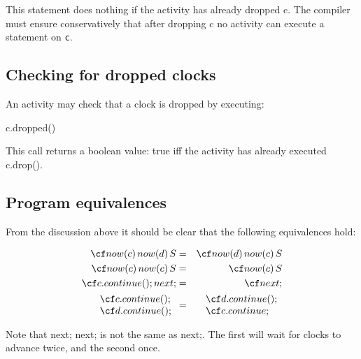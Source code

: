 \noindent{} 
This statement does nothing if the activity has already dropped {\cf c}. 
The compiler must ensure conservatively that after dropping {\cf c} no
activity can execute a statement on {\tt c}.

\subsection{Checking for dropped clocks}
An activity may check that a clock is dropped by executing:
\begin{x10}
c.dropped()
\end{x10}
\noindent This call returns a {\cf boolean} value: {\cf true} iff the
activity has already executed {\cf c.drop()}.

\subsection{Program equivalences}

From the discussion above it should be clear that the following
equivalences hold:

\begin{eqnarray}
 {\cf now(c)\, now(d)\,S} &=& {\cf now(d)\, now(c)\,S}\\
 {\cf now(c)\, now(c)\,S} &=& {\cf now(c)\,S}\\
 {\cf c.continue();  next;} &=& {\cf next;}\\
\begin{array}{l}
 {\cf c.continue();}\\
 {\cf d.continue();}
\end{array}  &=& 
\begin{array}{l}
{\cf d.continue();}\\
{\cf c.continue;}
\end{array}
\end{eqnarray}

Note that {\cf next; next;} is not the same as {\cf next;}. The
first will wait for clocks to advance twice, and the second
once.  

